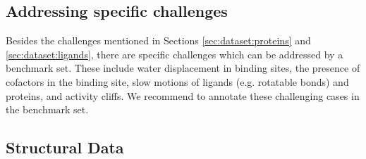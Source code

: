 \documentclass[9pt,bestpractices]{livecoms}
\begin{document}
\subsection{Addressing specific challenges}
\label{sec:dataset:challenges}

Besides the challenges mentioned in Sections \ref{sec:dataset:proteins} and \ref{sec:dataset:ligands},
there are specific challenges which can be addressed by a benchmark set. These include 
water displacement in binding sites,
the presence of cofactors in the binding site, 
slow motions of ligands (e.g. rotatable bonds) and proteins, and 
activity cliffs.
We recommend to annotate these challenging cases in the benchmark set.









\subsection{Structural Data}
\label{sec:struct_data}
\end{document}
